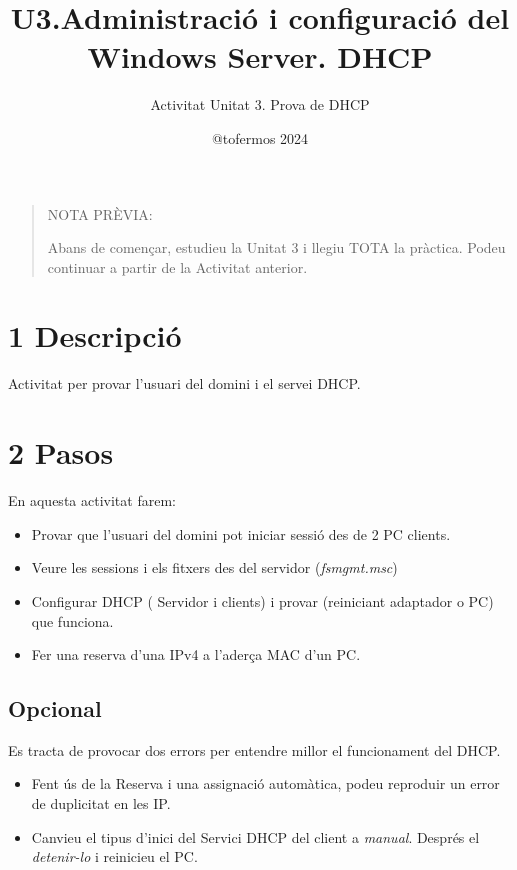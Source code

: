 \documentclass[
  a4paper,
]{article}
\title{U3.Administració i configuració del Windows Server. DHCP}
\subtitle{Activitat Unitat 3. Prova de DHCP}
\author{@tofermos 2024}
\date{}
\begin{document}
\maketitle

{
\setcounter{tocdepth}{2}
\tableofcontents
}
\newpage
\renewcommand\tablename{Tabla}

\begin{quote}
NOTA PRÈVIA:

Abans de començar, estudieu la Unitat 3 i llegiu TOTA la pràctica. Podeu
continuar a partir de la Activitat anterior.
\end{quote}

\section{1 Descripció}\label{descripciuxf3}

Activitat per provar l'usuari del domini i el servei DHCP.

\section{2 Pasos}\label{pasos}

En aquesta activitat farem:

\begin{itemize}
\item
  Provar que l'usuari del domini pot iniciar sessió des de 2 PC clients.
\item
  Veure les sessions i els fitxers des del servidor (\emph{fsmgmt.msc})
\item
  Configurar DHCP ( Servidor i clients) i provar (reiniciant adaptador o
  PC) que funciona.
\item
  Fer una reserva d'una IPv4 a l'aderça MAC d'un PC.
\end{itemize}

\subsection{Opcional}\label{opcional}

Es tracta de provocar dos errors per entendre millor el funcionament del
DHCP.

\begin{itemize}
\item
  Fent ús de la Reserva i una assignació automàtica, podeu reproduir un
  error de duplicitat en les IP.
\item
  Canvieu el tipus d'inici del Servici DHCP del client a \emph{manual}.
  Després el \emph{detenir-lo} i reinicieu el PC.
\end{itemize}
\end{document}
